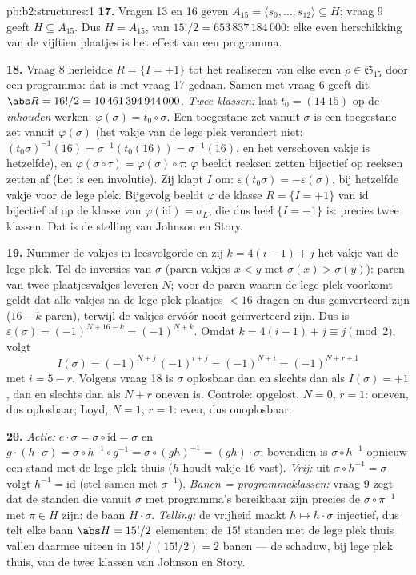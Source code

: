 \begin{solution}{pb:b2:structures:1}
\textbf{17.} Vragen 13 en 16 geven $A_{15} = \langle s_0, \dots,
s_{12}\rangle \subseteq H$; vraag 9 geeft $H \subseteq A_{15}$.
Dus $H = A_{15}$, van  $15!/2 = 653\,837\,184\,000$: elke even
herschikking van de vijftien plaatjes is het effect van een
programma.

\textbf{18.} Vraag 8 herleidde $R = \{I = +1\}$ tot het
realiseren van elke even $\rho \in \mathfrak{S}_{15}$ door een
programma: dat is met vraag 17 gedaan. Samen met vraag 6 geeft
dit $\abs R = 16!/2 = 10\,461\,394\,944\,000$. \emph{Twee
klassen:} laat $t_0 = (14\ 15)$ op de \emph{inhouden} werken:
$\varphi(\sigma) = t_0 \circ \sigma$. Een toegestane zet vanuit
$\sigma$ is een toegestane zet vanuit $\varphi(\sigma)$ (het vakje
van de lege plek verandert niet: $(t_0\sigma)^{-1}(16) =
\sigma^{-1}(t_0(16)) = \sigma^{-1}(16)$, en het verschoven vakje
is hetzelfde), en $\varphi(\sigma \circ \tau) = \varphi(\sigma)
\circ \tau$: $\varphi$ beeldt reeksen zetten bijectief op reeksen
zetten af (het is een involutie). Zij klapt $I$ om:
$\varepsilon(t_0\sigma) = -\varepsilon(\sigma)$, bij hetzelfde
vakje voor de lege plek. Bijgevolg beeldt $\varphi$ de klasse $R =
\{I = +1\}$ van $\mathrm{id}$ bijectief af op de klasse van
$\varphi(\mathrm{id}) = \sigma_L$, die dus heel $\{I = -1\}$ is:
precies twee klassen. Dat is de stelling van Johnson en Story.

\textbf{19.} Nummer de vakjes in leesvolgorde en zij $k = 4(i - 1)
+ j$ het vakje van de lege plek. Tel de inversies van $\sigma$
(paren vakjes $x < y$ met $\sigma(x) > \sigma(y)$): paren van twee
plaatjesvakjes leveren $N$; voor de paren waarin de lege plek
voorkomt geldt dat alle vakjes na de lege plek plaatjes $< 16$
dragen en dus geïnverteerd zijn ($16 - k$ paren), terwijl de
vakjes ervóór nooit geïnverteerd zijn. Dus is $\varepsilon(\sigma)
= (-1)^{N + 16 - k} = (-1)^{N + k}$. Omdat $k = 4(i-1) + j \equiv
j \pmod 2$, volgt
\[
I(\sigma) = (-1)^{N + j}\,(-1)^{i + j} = (-1)^{N + i}
= (-1)^{N + r + 1}
\]
met $i = 5 - r$. Volgens vraag 18 is $\sigma$ oplosbaar dan en
slechts dan als $I(\sigma) = +1$, dan en slechts dan als $N + r$
oneven is. Controle: opgelost, $N = 0$, $r = 1$: oneven, dus
oplosbaar; Loyd, $N = 1$, $r = 1$: even, dus onoplosbaar.

\textbf{20.} \emph{Actie:} $e \cdot \sigma = \sigma \circ
\mathrm{id} = \sigma$ en $g \cdot (h \cdot \sigma) = \sigma \circ
h^{-1} \circ g^{-1} = \sigma \circ (gh)^{-1} = (gh) \cdot \sigma$;
bovendien is $\sigma \circ h^{-1}$ opnieuw een stand met de lege
plek thuis ($h$ houdt vakje $16$ vast). \emph{Vrij:} uit $\sigma
\circ h^{-1} = \sigma$ volgt $h^{-1} = \mathrm{id}$ (stel samen
met $\sigma^{-1}$). \emph{Banen = programmaklassen:} vraag 9 zegt
dat de standen die vanuit $\sigma$ met programma's bereikbaar zijn
precies de $\sigma \circ \pi^{-1}$ met $\pi \in H$ zijn: de baan
$H \cdot \sigma$. \emph{Telling:} de vrijheid maakt $h \mapsto h
\cdot \sigma$ injectief, dus telt elke baan $\abs H = 15!/2$
elementen; de $15!$ standen met de lege plek thuis vallen daarmee
uiteen in $15!\,/\,(15!/2) = 2$ banen --- de schaduw, bij lege
plek thuis, van de twee klassen van Johnson en Story.


\end{solution}
